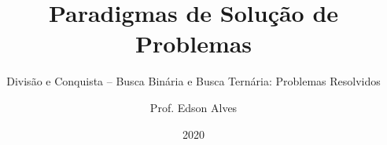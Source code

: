 \title{Paradigmas de Solução de Problemas}
\subtitle{Divisão e Conquista -- Busca Binária e Busca Ternária: Problemas Resolvidos}
\date{2020}
\author{Prof. Edson Alves}
